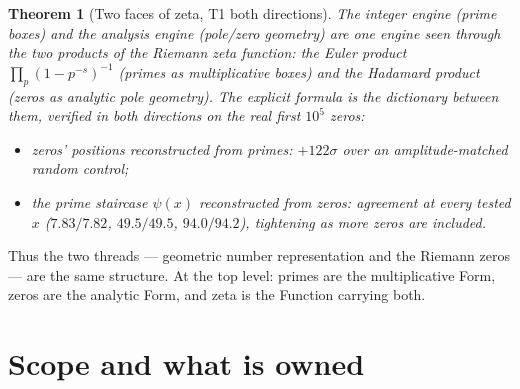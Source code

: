 \documentclass[11pt]{article}
\newtheorem{theorem}{Theorem}
\begin{document}
\begin{theorem}[Two faces of zeta, T1 both directions]
The integer engine (prime boxes) and the analysis engine (pole/zero geometry) are one engine seen through
the two products of the Riemann zeta function: the Euler product $\prod_p (1-p^{-s})^{-1}$ (primes as
multiplicative boxes) and the Hadamard product (zeros as analytic pole geometry). The explicit formula is
the dictionary between them, verified in both directions on the real first $10^5$ zeros:
\begin{itemize}\setlength\itemsep{1pt}
\item zeros' positions reconstructed from primes: $+122\sigma$ over an amplitude-matched random control;
\item the prime staircase $\psi(x)$ reconstructed from zeros: agreement at every tested $x$
($7.83/7.82$, $49.5/49.5$, $94.0/94.2$), tightening as more zeros are included.
\end{itemize}
\end{theorem}

Thus the two threads --- geometric number representation and the Riemann zeros --- are the same structure.
At the top level: primes are the multiplicative Form, zeros are the analytic Form, and zeta is the Function
carrying both.

\section{Scope and what is owned}
\end{document}
